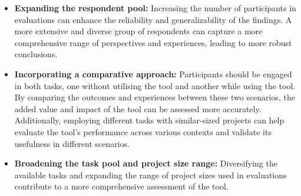 \begin{itemize}
  \item \textbf{Expanding the respondent pool:} Increasing the number of
    participants in evaluations can enhance the reliability and
    generalizability of the findings. A more extensive and diverse group of
    respondents can capture a more comprehensive range of perspectives and
    experiences, leading to more robust conclusions.
  \item \textbf{Incorporating a comparative approach:} Participants should be
    engaged in both tasks, one without utilising the tool and another while
    using the tool. By comparing the outcomes and experiences between these two
    scenarios, the added value and impact of the tool can be assessed more
    accurately. Additionally, employing different tasks with similar-sized
    projects can help evaluate the tool's performance across various contexts
    and validate its usefulness in different scenarios.
  \item \textbf{Broadening the task pool and project size range:} Diversifying
    the available tasks and expanding the range of project sizes used in
    evaluations contribute to a more comprehensive assessment of the tool.
\end{itemize}
